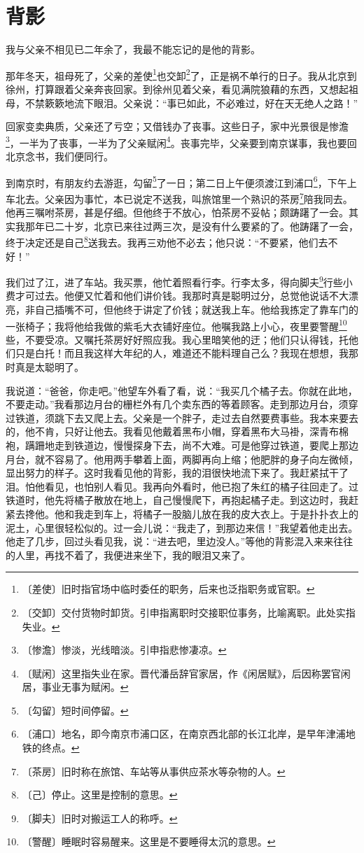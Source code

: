 \documentclass[12pt,UTF-8,openany]{ctexbook}
\begin{document}
\chapter{背影}

\begin{large}
    
    我与父亲不相见已二年余了，我最不能忘记的是他的背影。
    
    那年冬天，祖母死了，父亲的差使\footnote{〔差使〕旧时指官场中临时委任的职务，后来也泛指职务或官职。}也交卸\footnote{〔交卸〕交付货物时卸货。引申指离职时交接职位事务，比喻离职。此处实指失业。}了，正是祸不单行的日子。我从北京到徐州，打算跟着父亲奔丧回家。到徐州见着父亲，看见满院狼藉的东西，又想起祖母，不禁簌簌地流下眼泪。父亲说：“事已如此，不必难过，好在天无绝人之路！”
    
    回家变卖典质，父亲还了亏空；又借钱办了丧事。这些日子，家中光景很是惨澹\footnote{〔惨澹〕惨淡，光线暗淡。引申指悲惨凄凉。}，一半为了丧事，一半为了父亲赋闲\footnote{〔赋闲〕这里指失业在家。晋代潘岳辞官家居，作《闲居赋》，后因称罢官闲居，事业无事为赋闲。}。丧事完毕，父亲要到南京谋事，我也要回北京念书，我们便同行。
    
    到南京时，有朋友约去游逛，勾留\footnote{〔勾留〕短时间停留。}了一日；第二日上午便须渡江到浦口\footnote{〔浦口〕地名，即今南京市浦口区，在南京西北部的长江北岸，是早年津浦地铁的终点。}，下午上车北去。父亲因为事忙，本已说定不送我，叫旅馆里一个熟识的茶房\footnote{〔茶房〕旧时称在旅馆、车站等从事供应茶水等杂物的人。}陪我同去。他再三嘱咐茶房，甚是仔细。但他终于不放心，怕茶房不妥帖；颇踌躇了一会。其实我那年已二十岁，北京已来往过两三次，是没有什么要紧的了。他踌躇了一会，终于决定还是自己\footnote{〔己〕停止。这里是控制的意思。}送我去。我再三劝他不必去；他只说：“不要紧，他们去不好！”
    
    我们过了江，进了车站。我买票，他忙着照看行李。行李太多，得向脚夫\footnote{〔脚夫〕旧时对搬运工人的称呼。}行些小费才可过去。他便又忙着和他们讲价钱。我那时真是聪明过分，总觉他说话不大漂亮，非自己插嘴不可，但他终于讲定了价钱；就送我上车。他给我拣定了靠车门的一张椅子；我将他给我做的紫毛大衣铺好座位。他嘱我路上小心，夜里要警醒\footnote{〔警醒〕睡眠时容易醒来。这里是不要睡得太沉的意思。}些，不要受凉。又嘱托茶房好好照应我。我心里暗笑他的迂；他们只认得钱，托他们只是白托！而且我这样大年纪的人，难道还不能料理自己么？我现在想想，我那时真是太聪明了。
    
    我说道：“爸爸，你走吧。”他望车外看了看，说：“我买几个橘子去。你就在此地，不要走动。”我看那边月台的栅栏外有几个卖东西的等着顾客。走到那边月台，须穿过铁道，须跳下去又爬上去。父亲是一个胖子，走过去自然要费事些。我本来要去的，他不肯，只好让他去。我看见他戴着黑布小帽，穿着黑布大马褂，深青布棉袍，蹒跚地走到铁道边，慢慢探身下去，尚不大难。可是他穿过铁道，要爬上那边月台，就不容易了。他用两手攀着上面，两脚再向上缩；他肥胖的身子向左微倾，显出努力的样子。这时我看见他的背影，我的泪很快地流下来了。我赶紧拭干了泪。怕他看见，也怕别人看见。我再向外看时，他已抱了朱红的橘子往回走了。过铁道时，他先将橘子散放在地上，自己慢慢爬下，再抱起橘子走。到这边时，我赶紧去搀他。他和我走到车上，将橘子一股脑儿放在我的皮大衣上。于是扑扑衣上的泥土，心里很轻松似的。过一会儿说：“我走了，到那边来信！”我望着他走出去。他走了几步，回过头看见我，说：“进去吧，里边没人。”等他的背影混入来来往往的人里，再找不着了，我便进来坐下，我的眼泪又来了。
    

\end{large}
\end{document}
